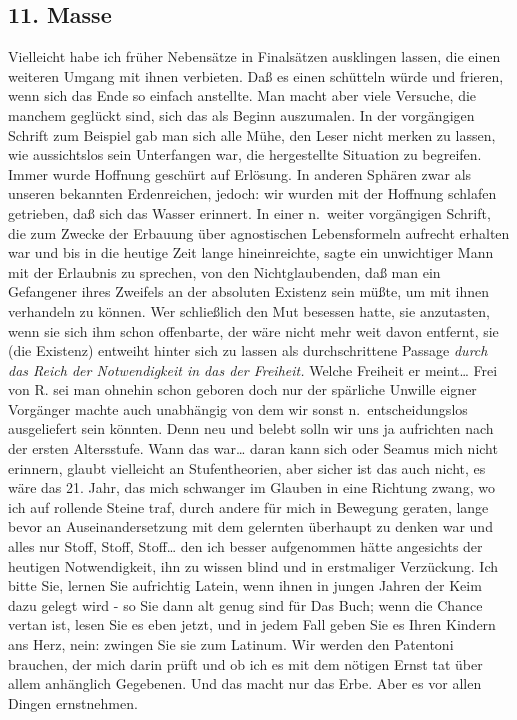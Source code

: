 \documentclass[
]{article}
\author{}
\date{\vspace{-2.5em}}
\begin{document}
\subsection{11. Masse}\label{masse}

Vielleicht habe ich früher Nebensätze in Finalsätzen ausklingen lassen,
die einen weiteren Umgang mit ihnen verbieten. Daß es einen schütteln
würde und frieren, wenn sich das Ende so einfach anstellte. Man macht
aber viele Versuche, die manchem geglückt sind, sich das als Beginn
auszumalen. In der vorgängigen Schrift zum Beispiel gab man sich alle
Mühe, den Leser nicht merken zu lassen, wie aussichtslos sein
Unterfangen war, die hergestellte Situation zu begreifen. Immer wurde
Hoffnung geschürt auf Erlösung. In anderen Sphären zwar als unseren
bekannten Erdenreichen, jedoch: wir wurden mit der Hoffnung schlafen
getrieben, daß sich das Wasser erinnert. In einer n.~weiter vorgängigen
Schrift, die zum Zwecke der Erbauung über agnostischen Lebensformeln
aufrecht erhalten war und bis in die heutige Zeit lange hineinreichte,
sagte ein unwichtiger Mann mit der Erlaubnis zu sprechen, von den
Nichtglaubenden, daß man ein Gefangener ihres Zweifels an der absoluten
Existenz sein müßte, um mit ihnen verhandeln zu können. Wer schließlich
den Mut besessen hatte, sie anzutasten, wenn sie sich ihm schon
offenbarte, der wäre nicht mehr weit davon entfernt, sie (die Existenz)
entweiht hinter sich zu lassen als durchschrittene Passage \emph{durch
das Reich der Notwendigkeit in das der Freiheit.} Welche Freiheit er
meint\ldots{} Frei von R. sei man ohnehin schon geboren doch nur der
spärliche Unwille eigner Vorgänger machte auch unabhängig von dem wir
sonst n.~entscheidungslos ausgeliefert sein könnten. Denn neu und belebt
solln wir uns ja aufrichten nach der ersten Altersstufe. Wann das
war\ldots{} daran kann sich oder Seamus mich nicht erinnern, glaubt
vielleicht an Stufentheorien, aber sicher ist das auch nicht, es wäre
das 21. Jahr, das mich schwanger im Glauben in eine Richtung zwang, wo
ich auf rollende Steine traf, durch andere für mich in Bewegung geraten,
lange bevor an Auseinandersetzung mit dem gelernten überhaupt zu denken
war und alles nur Stoff, Stoff, Stoff\ldots{} den ich besser aufgenommen
hätte angesichts der heutigen Notwendigkeit, ihn zu wissen blind und in
erstmaliger Verzückung. Ich bitte Sie, lernen Sie aufrichtig Latein,
wenn ihnen in jungen Jahren der Keim dazu gelegt wird - so Sie dann alt
genug sind für Das Buch; wenn die Chance vertan ist, lesen Sie es eben
jetzt, und in jedem Fall geben Sie es Ihren Kindern ans Herz, nein:
zwingen Sie sie zum Latinum. Wir werden den Patentoni brauchen, der mich
darin prüft und ob ich es mit dem nötigen Ernst tat über allem
anhänglich Gegebenen. Und das macht nur das Erbe. Aber es vor allen
Dingen ernstnehmen.
\end{document}
